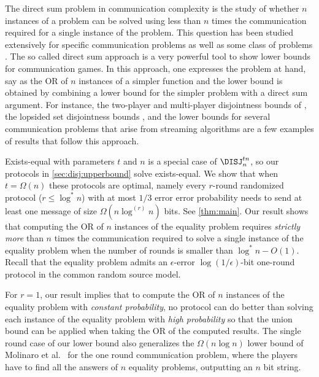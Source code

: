 The direct sum problem in communication complexity is the study
of whether $n$ instances of a problem can be solved using less
than $n$ times the communication required for a single instance
of the problem. This question has been studied extensively for
specific communication problems as well as some class of
problems \cite{ChakrabartiSWY2001, JainRS2003, JainRS2005,
Ben-AroyaRW2008, Gavinsky2008, JainKN2008, HarshaJMR2010, BarakBCR2010}.
The so called direct sum approach is a very powerful tool to
show lower bounds for communication games. In this approach, one
expresses the problem at hand, say as the OR of $n$ instances of
a simpler function and the lower bound is obtained by combining
a lower bound for the simpler problem with a direct sum
argument. For instance, the two-player and multi-player
disjointness bounds of \cite{Bar-YossefJKS2004}, the lopsided set
disjointness bounds \cite{Patrascu2011}, and the lower bounds for
several communication problems that arise from streaming
algorithms \cite{JayramW2009, MagniezMN2010} are a few examples of
results that follow this approach.

Exists-equal with parameters $t$ and $n$ is a special case of
$\DISJ_n^{tn}$, so our protocols in \autoref{sec:disj:upperbound}
solve exists-equal. We show that when $t=\Omega(n)$ these
protocols are optimal, namely every $r$-round randomized
protocol ($r\le\log^*n$) with at most $1/3$ error error
probability needs to send at least one message of size
$\Omega(n\log^{(r)}n)$ bits. See \autoref{thm:main}. Our result
shows that computing the OR of $n$ instances of the equality
problem requires {\em strictly more} than $n$ times the
communication required to solve a single instance of the
equality problem when the number of rounds is smaller than
$\log^* n-O(1)$. Recall that the equality problem admits an
$\epsilon$-error $\log(1/\epsilon)$-bit one-round protocol in
the common random source model.

For $r=1$, our result implies that to compute the OR of $n$
instances of the equality problem with {\em constant
probability}, no protocol can do better than solving each
instance of the equality problem with {\em high probability} so
that the union bound can be applied when taking the OR of the
computed results. The single round case of our lower bound also
generalizes the $\Omega(n\log n)$ lower bound of Molinaro et
al.\ \cite{MolinaroWY2013} for the one round communication
problem, where the players have to find all the answers of $n$
equality problems, outputting an $n$ bit string.

